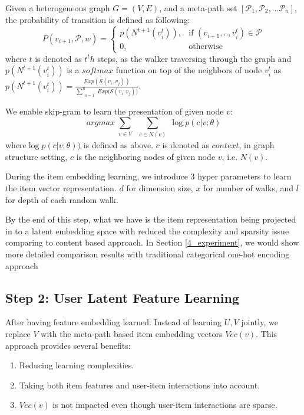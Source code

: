 Given a heterogeneous graph $G = (V,E)$, and a meta-path set $[\mathcal{P}_1, \mathcal{P}_2, ... \mathcal{P}_n]$, the probability of transition is defined as following:
\begin{equation}\label{hetewalker}
    P(v_{i+1},\mathcal{P},w)= 
        \begin{cases}
            p({N^{t+1}(v_{i}^t)}),& \text{if } (v_{i+1}, .., v_{i}^t) \in \mathcal{P} \\
            0,              & \text{otherwise}
        \end{cases}
\end{equation}
where $t$ is denoted as $t^th$ steps, as the walker traversing through the graph and $p({N^{t+1}(v_{i}^t)})$ is a $softmax$ function on top of the neighbors of node $v_{i}^t$ as $p({N^{t+1}(v_{i}^t)}) = \frac{Exp(\mathcal{S}(v_i,v_j))}{\sum\limits_{\substack{n=1}}^{n} {Exp(\mathcal{S}(v_i,v_j)})}$.

We enable skip-gram to learn the presentation of given node $v$:
\begin{equation}\label{skipgram}
    arg max
    \sum\limits_{\substack{v \in V}}
    \sum\limits_{\substack{c \in N(v)}}
    \log p({c|v;\theta})
\end{equation}
where$\log p({c|v;\theta}))$ is defined as above. $c$ is denoted as $context$, in graph structure setting, $c$ is the neighboring nodes of given node $v$, i.e. $N(v)$. 

During the item embedding learning, we introduce 3 hyper parameters to learn the item vector representation. $d$ for dimension size, $x$ for number of walks, and $l$ for depth of each random walk.

By the end of this step, what we have is the item representation being projected in to a latent embedding space with reduced the complexity and sparsity issue comparing to content based approach. In Section \ref{4_experiment}, we would show more detailed comparison results with traditional categorical one-hot encoding approach

\subsection{Step 2: User Latent Feature Learning}\label{3PCC}
After having feature embedding learned. Instead of learning $U, V$ jointly, we replace $V$ with the meta-path based item embedding vectors $Vec(v)$. This approach provides several benefits:

\begin{enumerate}
    \item Reducing learning complexities.
    \item Taking both item features and user-item interactions into account.
    \item $Vec(v)$ is not impacted even though user-item interactions are sparse.
\end{enumerate}

